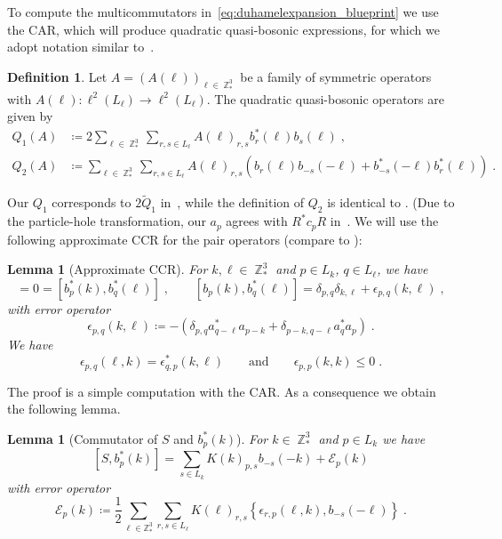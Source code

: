 \documentclass[12pt,a4paper]{article}
\numberwithin{equation}{section}
\newcommand{\1}{\mathbb{I}}
\DeclareMathOperator{\Z}{\mathbb{Z}}
\theoremstyle{plain}
\newtheorem{lemma}[theorem]{Lemma}
\theoremstyle{definition}
\newtheorem{definition}[theorem]{Definition}
\theoremstyle{remark}
\theoremstyle{plain}
\theoremstyle{definition}
\theoremstyle{remark}
\begin{document}
To compute the multicommutators in~\eqref{eq:duhamelexpansion_blueprint} we use the CAR, which will produce quadratic quasi-bosonic expressions, for which we adopt notation similar to~\cite{CHN21}.

\begin{definition} \label{def:Q}
Let $A=(A(\ell))_{\ell \in \Z^3_*} $ be a family of symmetric operators with $A(\ell): \ell^2(L_\ell)\rightarrow \ell^2(L_\ell)$. The quadratic quasi-bosonic operators are given by
\begin{equation} \label{eq:Q}
\begin{aligned}
	Q_1(A)&\coloneq 2 \sum_{\ell \in \Z^3_*}\sum_{r,s \in L_{\ell}}A(\ell)_{r,s} b^*_r(\ell)b_{s}(\ell) \;,\\
	Q_2(A)&\coloneq \sum_{\ell \in \Z^3_*}\sum_{r,s \in L_{\ell}}A(\ell)_{r,s} \left(b_r(\ell)b_{-s}(-\ell)+b^*_{-s}(-\ell)b^*_{r}(\ell)\right) \;.
\end{aligned}
\end{equation} 
\end{definition}
Our $ Q_1 $ corresponds to $ 2 \tilde Q_1 $ in~\cite{CHN21}, while the definition of $ Q_2 $ is identical to \cite{CHN21}. (Due to the particle-hole transformation, our $ a_p $ agrees with $ R^* c_p R $ in~\cite{CHN21,CHN23,CHN24}. We will use the following approximate CCR for the pair operators (compare to \cite[(1.66)]{CHN21}):

\begin{lemma}[Approximate CCR]\label{lem:paircomm}
For $k,\ell \in \Z^3_*$ and $p \in L_{k}$, $q\in L_{\ell}$, we have
\begin{equation}
	[b_{p}(k),b_{q}(\ell)]
	= 0 = [b^*_{p}(k),b^*_{q}(\ell)]  \;, \qquad
	[b_{p}(k),b^*_{q}(\ell)]
	= \delta_{p,q}\delta_{k,\ell} + \epsilon_{p,q}(k,\ell) \;,
\end{equation}
 with error operator
\begin{equation}
	\epsilon_{p,q}(k,\ell)
	\coloneq -\left(\delta_{p,q}a^*_{q-\ell}a_{p-k} + \delta_{p-k,q-\ell}a^*_{q}a_{p}\right) \;.
\end{equation}
We have
\[\epsilon_{p,q}(\ell,k) = \epsilon^*_{q,p}(k,\ell) \qquad \text{and} \qquad \epsilon_{p,p}(k,k)\leq 0 \;.\]
\end{lemma}
The proof is a simple computation with the CAR. As a consequence we obtain the following lemma.

\begin{lemma}[Commutator of $S $ and $b^*_p(k)$]
For $k \in \Z^3_*$ and $p \in L_k$ we have
\begin{equation} \label{eq:comm_Kb}
	[S, b^*_p(k)]
	= \sum_{s\in L_{k}}K(k)_{p,s}b_{-s}(-k)
		+ \mathcal{E}_{p}(k)
\end{equation}
with error operator
\begin{equation}\label{eq:commerrKb}
	\mathcal{E}_{p}(k)
	\coloneq \frac{1}{2}\sum_{\ell\in \mathbb{Z}^3_*}\sum_{r,s\in L_\ell}K(\ell)_{r,s}\left\{\epsilon_{r,p}(\ell,k),b_{-s}(-\ell)\right\} \;.
\end{equation}
\end{lemma}
\end{document}
